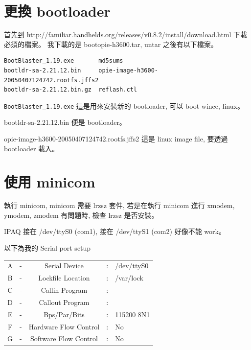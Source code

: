 \documentclass[12pt,a4paper]{article}
\begin{document}
\begin{CJK}{UTF8}{cwmu} %
\renewcommand{\contentsname}{目錄}
\renewcommand{\tablename}{表}
\renewcommand{\figurename}{圖}
\renewcommand{\listtablename}{表格目錄}
\renewcommand{\listfigurename}{圖目錄}





\newpage

\tableofcontents
\newpage


\section{更換 bootloader}
首先到
http://familiar.handhelds.org/releases/v0.8.2/install/download.html
下載必須的檔案。
我下載的是 bootopie-h3600.tar,
untar 之後有以下檔案。

\begin{verbatim}
BootBlaster_1.19.exe       md5sums
bootldr-sa-2.21.12.bin     opie-image-h3600-20050407124742.rootfs.jffs2
bootldr-sa-2.21.12.bin.gz  reflash.ctl
\end{verbatim}

\verb+BootBlaster_1.19.exe+ 這是用來安裝新的 bootloader,
可以 boot wince, linux。

bootldr-sa-2.21.12.bin 便是 bootloader。

opie-image-h3600-20050407124742.rootfs.jffs2 這是 linux image file,
要透過 bootloader 載入。

\section{使用 minicom}
執行 minicom, minicom 需要 lrzsz 套件,
若是在執行 minicom 進行 xmodem, ymodem, zmodem 有問題時,
檢查 lrzsz 是否安裝。

IPAQ 接在 /dev/ttyS0 (com1),
接在 /dev/ttyS1 (com2) 好像不能 work。

以下為我的 Serial port setup   

\begin{tabular}{ccccl}
A & - &   Serial Device &     : & /dev/ttyS0\\
B & - & Lockfile Location  &   : & /var/lock\\
C & - &  Callin Program    & : &  \\
D & - &  Callout Program   & : &  \\
E & - &  Bps/Par/Bits    &   : & 115200 8N1\\
F & - & Hardware Flow Control & : & No\\
G & - & Software Flow Control &:& No   \\
\end{tabular}


\end{CJK}
\end{document}

